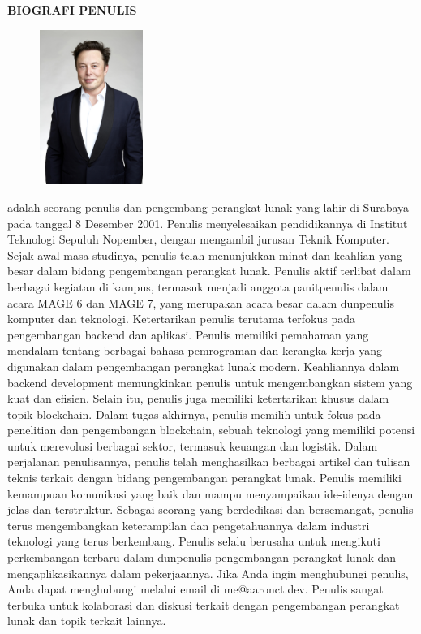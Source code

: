 \begin{center}
  \Large
  \textbf{BIOGRAFI PENULIS}
\end{center}


\vspace{2ex}

\begin{figure}
  \centering
  \vspace{-3ex}
  \includegraphics[width=0.3\textwidth]{gambar/elon.jpg}
  \vspace{-4ex}
\end{figure}

\name{} adalah seorang penulis dan pengembang perangkat lunak yang lahir di Surabaya pada tanggal 8 Desember 2001. Penulis menyelesaikan pendidikannya di Institut Teknologi Sepuluh Nopember, dengan mengambil jurusan Teknik Komputer.
Sejak awal masa studinya, penulis telah menunjukkan minat dan keahlian yang besar dalam bidang pengembangan perangkat lunak. Penulis aktif terlibat dalam berbagai kegiatan di kampus, termasuk menjadi anggota panitpenulis dalam acara MAGE 6 dan MAGE 7, yang merupakan acara besar dalam dunpenulis komputer dan teknologi.
Ketertarikan penulis terutama terfokus pada pengembangan backend dan aplikasi. Penulis memiliki pemahaman yang mendalam tentang berbagai bahasa pemrograman dan kerangka kerja yang digunakan dalam pengembangan perangkat lunak modern. Keahliannya dalam backend development memungkinkan penulis untuk mengembangkan sistem yang kuat dan efisien.
Selain itu, penulis juga memiliki ketertarikan khusus dalam topik blockchain. Dalam tugas akhirnya, penulis memilih untuk fokus pada penelitian dan pengembangan blockchain, sebuah teknologi yang memiliki potensi untuk merevolusi berbagai sektor, termasuk keuangan dan logistik.
Dalam perjalanan penulisannya, penulis telah menghasilkan berbagai artikel dan tulisan teknis terkait dengan bidang pengembangan perangkat lunak. Penulis memiliki kemampuan komunikasi yang baik dan mampu menyampaikan ide-idenya dengan jelas dan terstruktur.
Sebagai seorang yang berdedikasi dan bersemangat, penulis terus mengembangkan keterampilan dan pengetahuannya dalam industri teknologi yang terus berkembang. Penulis selalu berusaha untuk mengikuti perkembangan terbaru dalam dunpenulis pengembangan perangkat lunak dan mengaplikasikannya dalam pekerjaannya.
Jika Anda ingin menghubungi penulis, Anda dapat menghubungi melalui email di me@aaronct.dev. Penulis sangat terbuka untuk kolaborasi dan diskusi terkait dengan pengembangan perangkat lunak dan topik terkait lainnya.
